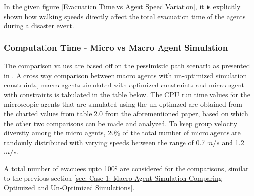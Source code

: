 In the given figure \ref{Evacuation Time vs Agent Speed Variation}, it is explicitly shown how walking speeds directly affect the total evacuation time of the agents during a disaster event.

\subsubsection{Computation Time - Micro vs Macro Agent Simulation}
\label{sec: Computation Time - Micro vs Macro Agent Simulation}

The comparison values are based off on the pessimistic path scenario as presented in \cite{ref5}. A cross way comparison between macro agents with un-optimized simulation constraints, macro agents simulated with optimized constraints and micro agent with constraints is tabulated in the table below. The CPU run time values for the microscopic agents that are simulated using the un-optimzed are obtained from the charted values from table 2.0 from the aforementioned paper, based on which the other two comparisons can be made and analyzed. To keep group velocity diversity among the micro agents, 20\% of the total number of micro agents are randomly distributed with varying speeds between the range of 0.7 $m/s$ and 1.2 $m/s$.

A total number of evacuees upto 1008 are considered for the comparisons, similar to the previous section \ref{sec: Case 1: Macro Agent Simulation Comparing Optimized and Un-Optimized Simulations}. 


